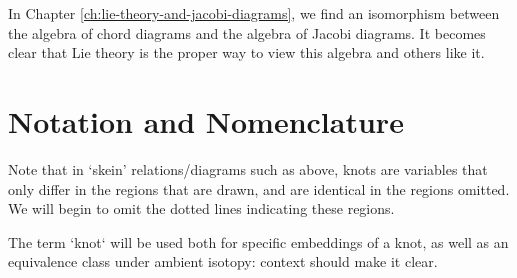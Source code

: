 In Chapter \ref{ch:lie-theory-and-jacobi-diagrams}, we find an isomorphism between the algebra of chord diagrams and the algebra of Jacobi diagrams. It becomes clear that Lie theory is the proper way to view this algebra and others like it.


\section*{Notation and Nomenclature}


Note that in `skein' relations/diagrams such as above, knots are variables that only differ in the regions that are drawn, and are identical in the regions omitted. We will begin to omit the dotted lines indicating these regions.

The term `knot` will be used both for specific embeddings of a knot, as well as an equivalence class under ambient isotopy: context should make it clear.
